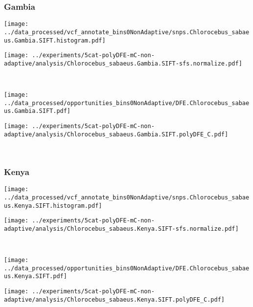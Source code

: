 \subsubsection{Gambia}

\begin{minipage}{0.49\linewidth}
    \texttt{[image: ../data\_processed/vcf\_annotate\_bins0NonAdaptive/snps.Chlorocebus\_sabaeus.Gambia.SIFT.histogram.pdf]}
\end{minipage}
\begin{minipage}{0.49\linewidth}
    \texttt{[image: ../experiments/5cat-polyDFE-mC-non-adaptive/analysis/Chlorocebus\_sabaeus.Gambia.SIFT-sfs.normalize.pdf]}
\end{minipage}
\\
\begin{minipage}{0.49\linewidth}
    \texttt{[image: ../data\_processed/opportunities\_bins0NonAdaptive/DFE.Chlorocebus\_sabaeus.Gambia.SIFT.pdf]}
\end{minipage}
\begin{minipage}{0.49\linewidth}
    \texttt{[image: ../experiments/5cat-polyDFE-mC-non-adaptive/analysis/Chlorocebus\_sabaeus.Gambia.SIFT.polyDFE\_C.pdf]}
\end{minipage}
\\

\subsubsection{Kenya}

\begin{minipage}{0.49\linewidth}
    \texttt{[image: ../data\_processed/vcf\_annotate\_bins0NonAdaptive/snps.Chlorocebus\_sabaeus.Kenya.SIFT.histogram.pdf]}
\end{minipage}
\begin{minipage}{0.49\linewidth}
    \texttt{[image: ../experiments/5cat-polyDFE-mC-non-adaptive/analysis/Chlorocebus\_sabaeus.Kenya.SIFT-sfs.normalize.pdf]}
\end{minipage}
\\
\begin{minipage}{0.49\linewidth}
    \texttt{[image: ../data\_processed/opportunities\_bins0NonAdaptive/DFE.Chlorocebus\_sabaeus.Kenya.SIFT.pdf]}
\end{minipage}
\begin{minipage}{0.49\linewidth}
    \texttt{[image: ../experiments/5cat-polyDFE-mC-non-adaptive/analysis/Chlorocebus\_sabaeus.Kenya.SIFT.polyDFE\_C.pdf]}
\end{minipage}
\\

